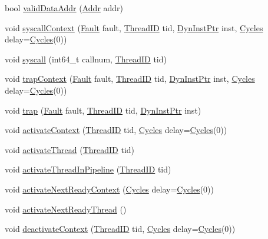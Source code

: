 \begin{DoxyCompactItemize}
\item 
bool \hyperlink{classInOrderCPU_afe01e4cef8897b8a4ff99d575875c9db}{validDataAddr} (\hyperlink{base_2types_8hh_af1bb03d6a4ee096394a6749f0a169232}{Addr} addr)
\item 
void \hyperlink{classInOrderCPU_a37f2ec6a00b1cd18aaf408f5a2d3a9f7}{syscallContext} (\hyperlink{classRefCountingPtr}{Fault} fault, \hyperlink{base_2types_8hh_ab39b1a4f9dad884694c7a74ed69e6a6b}{ThreadID} tid, \hyperlink{classRefCountingPtr}{DynInstPtr} inst, \hyperlink{classCycles}{Cycles} delay=\hyperlink{classCycles}{Cycles}(0))
\item 
void \hyperlink{classInOrderCPU_a2d6a2bbae85e604392f43b3418cdec97}{syscall} (int64\_\-t callnum, \hyperlink{base_2types_8hh_ab39b1a4f9dad884694c7a74ed69e6a6b}{ThreadID} tid)
\item 
void \hyperlink{classInOrderCPU_a89e3462bf1fe289c9196b20b1d4a907e}{trapContext} (\hyperlink{classRefCountingPtr}{Fault} fault, \hyperlink{base_2types_8hh_ab39b1a4f9dad884694c7a74ed69e6a6b}{ThreadID} tid, \hyperlink{classRefCountingPtr}{DynInstPtr} inst, \hyperlink{classCycles}{Cycles} delay=\hyperlink{classCycles}{Cycles}(0))
\item 
void \hyperlink{classInOrderCPU_abf76d6d245f7d3b17d26ea8dcc0cf36f}{trap} (\hyperlink{classRefCountingPtr}{Fault} fault, \hyperlink{base_2types_8hh_ab39b1a4f9dad884694c7a74ed69e6a6b}{ThreadID} tid, \hyperlink{classRefCountingPtr}{DynInstPtr} inst)
\item 
void \hyperlink{classInOrderCPU_ad1c701dd98d725950e539f84f9faa8ec}{activateContext} (\hyperlink{base_2types_8hh_ab39b1a4f9dad884694c7a74ed69e6a6b}{ThreadID} tid, \hyperlink{classCycles}{Cycles} delay=\hyperlink{classCycles}{Cycles}(0))
\item 
void \hyperlink{classInOrderCPU_a687aa4600423bb30ecf3bb1da6cd6000}{activateThread} (\hyperlink{base_2types_8hh_ab39b1a4f9dad884694c7a74ed69e6a6b}{ThreadID} tid)
\item 
void \hyperlink{classInOrderCPU_a1bd67266499bbc86c4c378d3e7d9256e}{activateThreadInPipeline} (\hyperlink{base_2types_8hh_ab39b1a4f9dad884694c7a74ed69e6a6b}{ThreadID} tid)
\item 
void \hyperlink{classInOrderCPU_a067a25ab186d028e9c581a68903f5e32}{activateNextReadyContext} (\hyperlink{classCycles}{Cycles} delay=\hyperlink{classCycles}{Cycles}(0))
\item 
void \hyperlink{classInOrderCPU_a74bc9652a3caf0d2554213837f7ddb3f}{activateNextReadyThread} ()
\item 
void \hyperlink{classInOrderCPU_adec8c3e8de71e0e066f2104e29ced591}{deactivateContext} (\hyperlink{base_2types_8hh_ab39b1a4f9dad884694c7a74ed69e6a6b}{ThreadID} tid, \hyperlink{classCycles}{Cycles} delay=\hyperlink{classCycles}{Cycles}(0))

\end{DoxyCompactItemize}
